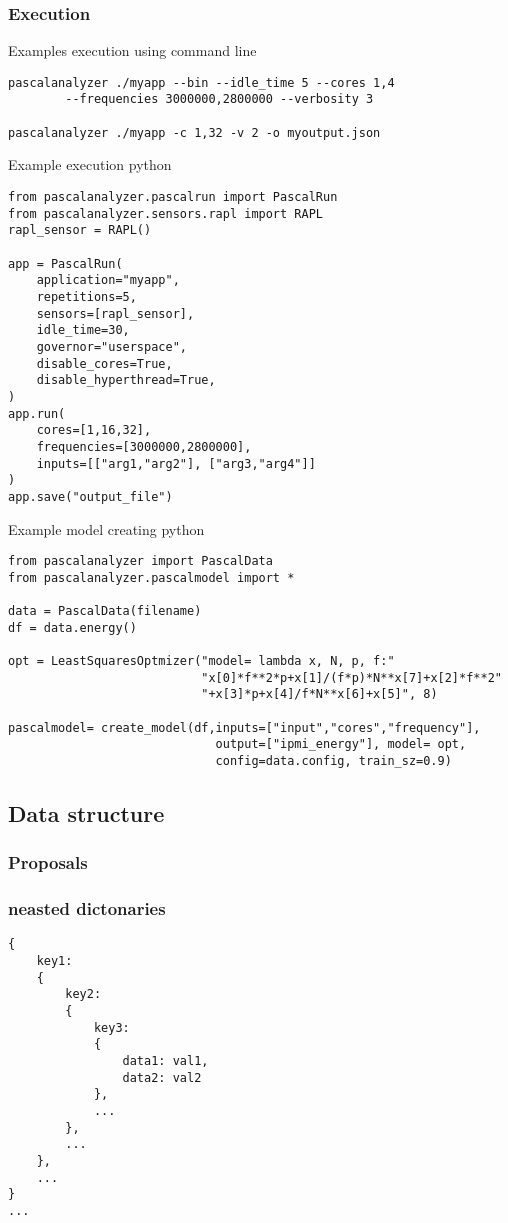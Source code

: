 \subsubsection{Execution}

Examples execution using command line
\begin{lstlisting}
pascalanalyzer ./myapp --bin --idle_time 5 --cores 1,4  
		--frequencies 3000000,2800000 --verbosity 3

pascalanalyzer ./myapp -c 1,32 -v 2 -o myoutput.json
\end{lstlisting}

Example execution python
\begin{lstlisting}
from pascalanalyzer.pascalrun import PascalRun
from pascalanalyzer.sensors.rapl import RAPL
rapl_sensor = RAPL()

app = PascalRun(
	application="myapp",
	repetitions=5,
	sensors=[rapl_sensor],
	idle_time=30,
	governor="userspace",
	disable_cores=True,
	disable_hyperthread=True,
)
app.run(
	cores=[1,16,32],
	frequencies=[3000000,2800000],
	inputs=[["arg1,"arg2"], ["arg3,"arg4"]]
)
app.save("output_file")
\end{lstlisting}

Example model creating python
\begin{lstlisting}
from pascalanalyzer import PascalData
from pascalanalyzer.pascalmodel import *

data = PascalData(filename)
df = data.energy()

opt = LeastSquaresOptmizer("model= lambda x, N, p, f:"
                           "x[0]*f**2*p+x[1]/(f*p)*N**x[7]+x[2]*f**2"
                           "+x[3]*p+x[4]/f*N**x[6]+x[5]", 8)

pascalmodel= create_model(df,inputs=["input","cores","frequency"],
                             output=["ipmi_energy"], model= opt,
                             config=data.config, train_sz=0.9)
\end{lstlisting}

\subsection{Data structure}

\subsubsection{Proposals}
\subsubsection{neasted dictonaries}
\begin{lstlisting}
{
	key1:
	{
		key2:
		{
			key3:
			{
				data1: val1,
				data2: val2
			},
			...
		},
		...
	},
	...
}
...
\end{lstlisting}

